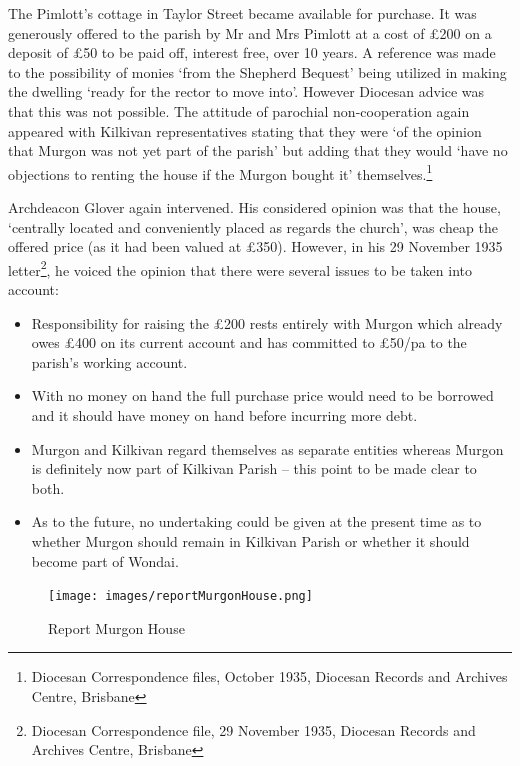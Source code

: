 The Pimlott's cottage in Taylor Street became available for purchase. It
was generously offered to the parish by Mr and Mrs Pimlott at a cost of
\pounds200 on a deposit of \pounds50 to be paid off, interest free, over 10 years. A
reference was made to the possibility of monies `from the Shepherd
Bequest' being utilized in making the dwelling `ready for the rector to
move into'. However Diocesan advice was that this was not possible. The
attitude of parochial non-cooperation again appeared with Kilkivan
representatives stating that they were `of the opinion that Murgon was
not yet part of the parish' but adding that they would `have no
objections to renting the house if the Murgon bought it'
themselves.\footnote{Diocesan Correspondence files, October 1935,
  Diocesan Records and Archives Centre, Brisbane}

Archdeacon Glover again intervened. His considered opinion was that the
house, `centrally located and conveniently placed as regards the
church', was cheap the offered price (as it had been valued at \pounds350).
However, in his 29 November 1935 letter\footnote{Diocesan Correspondence
  file, 29 November 1935, Diocesan Records and Archives Centre, Brisbane},
he voiced the opinion that there were several issues to be taken into
account:

\begin{itemize}
\item
  Responsibility for raising the \pounds200 rests entirely with Murgon which
  already owes \pounds400 on its current account and has committed to \pounds50/pa
  to the parish's working account.
\item
  With no money on hand the full purchase price would need to be
  borrowed and it should have money on hand before incurring more debt.
\item
  Murgon and Kilkivan regard themselves as separate entities whereas
  Murgon is definitely now part of Kilkivan Parish -- this point to be
  made clear to both.
\item
  As to the future, no undertaking could be given at the present time as
  to whether Murgon should remain in Kilkivan Parish or whether it
  should become part of Wondai.
\end{itemize}




\begin{figure}
\begin{center}
\texttt{[image: images/reportMurgonHouse.png]}
\caption{Report Murgon House}
\end{center}
\end{figure}


